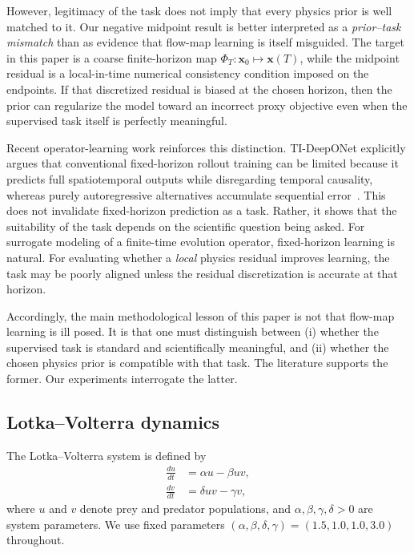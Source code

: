 \documentclass[11pt]{article}
\begin{document}
However, legitimacy of the task does not imply that every physics prior is well matched to it.
Our negative midpoint result is better interpreted as a \emph{prior--task mismatch} than as evidence that flow-map learning is itself misguided.
The target in this paper is a coarse finite-horizon map $\Phi_T : \bm{x}_0 \mapsto \bm{x}(T)$, while the midpoint residual is a local-in-time numerical consistency condition imposed on the endpoints.
If that discretized residual is biased at the chosen horizon, then the prior can regularize the model toward an incorrect proxy objective even when the supervised task itself is perfectly meaningful.

Recent operator-learning work reinforces this distinction.
TI-DeepONet explicitly argues that conventional fixed-horizon rollout training can be limited because it predicts full spatiotemporal outputs while disregarding temporal causality, whereas purely autoregressive alternatives accumulate sequential error~\cite{nayak2025tideeponet}.
This does not invalidate fixed-horizon prediction as a task.
Rather, it shows that the suitability of the task depends on the scientific question being asked.
For surrogate modeling of a finite-time evolution operator, fixed-horizon learning is natural.
For evaluating whether a \emph{local} physics residual improves learning, the task may be poorly aligned unless the residual discretization is accurate at that horizon.

Accordingly, the main methodological lesson of this paper is not that flow-map learning is ill posed.
It is that one must distinguish between
(i) whether the supervised task is standard and scientifically meaningful, and
(ii) whether the chosen physics prior is compatible with that task.
The literature supports the former.
Our experiments interrogate the latter.

\subsection{Lotka--Volterra dynamics}

The Lotka--Volterra system is defined by
\begin{align}
\frac{du}{dt} &= \alpha u - \beta uv, \label{eq:lv-prey}\\
\frac{dv}{dt} &= \delta uv - \gamma v, \label{eq:lv-pred}
\end{align}
where $u$ and $v$ denote prey and predator populations, and $\alpha,\beta,\gamma,\delta > 0$ are system parameters.
We use fixed parameters $(\alpha,\beta,\delta,\gamma) = (1.5, 1.0, 1.0, 3.0)$ throughout.
\end{document}
